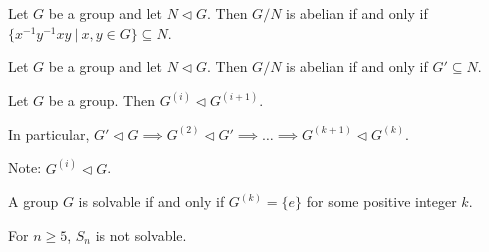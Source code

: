\documentclass{article}
\newcommand\inv{^{-1}}
\begin{document}
Let $G$ be a group and let $N \lhd G$. Then $G/N$ is abelian if and only if $\{x\inv y\inv x y~|~x,y\in G\} \subseteq N$.


Let $G$ be a group and let $N \lhd G$. Then $G/N$ is abelian if and only if $G'\subseteq N$.


Let $G$ be a group. Then $G^{(i)} \lhd G^{(i+1)}$.

In particular, $G' \lhd G \implies G^{(2)} \lhd G' \implies \hdots \implies G^{(k+1)} \lhd G^{(k)}$.

Note: $G^{(i)} \lhd G$.


A group $G$ is solvable if and only if $G^{(k)} = \{e\}$ for some positive integer $k$.


For $n \geq 5$, $S_n$ is not solvable.
\end{document}
